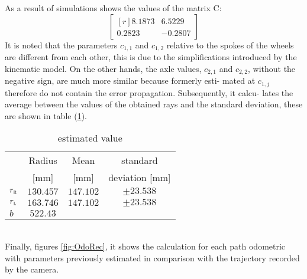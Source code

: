  As a result of simulations shows the values of the matrix C:
\begin{equation}
\label{eq:Cresult}
	\begin{bmatrix*}[r]
		8.1873  &  6.5229\\
    		0.2823  & -0.2807
	\end{bmatrix*}
\end{equation}
It is noted that the parameters $c_{1,1}$ and $c_{1,2}$ relative to the spokes of the wheels are different from each other, this is due to the simplifications introduced by the kinematic model. On the other hands, the axle values, $c_ {2,1}$ and $c_ {2,2}$, without the negative sign, are much more similar because formerly esti- mated at $c_{1,j}$ therefore do not contain the error propagation. Subsequently, it calcu- lates the average between the values of the obtained rays and the standard deviation, these are shown in table (\ref{tab:recapvalue}).
\begin{table}[!h]
\centering
	\begin{tabular}{lccc}
		\hline
								& Radius 	& Mean 	& standard\\
								&	[mm]	& [mm]	& deviation [mm]\\
		\hline
		$r_\textsc{r}$	&	$130.457$		& $147.102	$		&	$\pm23.538$\\
		$r_\textsc{l}$	&	$163.746$		& $147.102	$		&	$\pm23.538$\\
		$b$					&	$522.43$\\
		\hline
\end{tabular}
\caption{estimated value}
\label{tab:recapvalue}
\end{table}
\\Finally, figures \ref{fig:OdoRec}, it shows the calculation for each path odometric with parameters previously estimated in comparison with the trajectory recorded by the camera.
\begin{figure*}[htb]
\centering
{} \,
 \\
 \,
\caption{Odometry reconstruction}
\label{fig:OdoRec}
\end{figure*}

